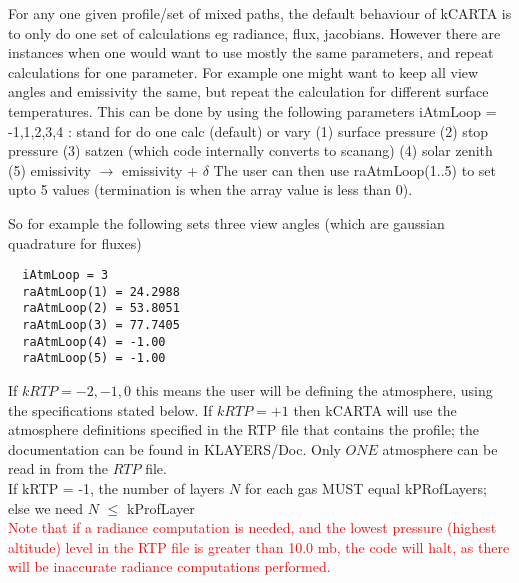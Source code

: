 \documentclass[12pt]{article}
\newcommand{\kc}{\textsf{kCARTA}\xspace}
\begin{document}
{\medskip
For any one given profile/set of mixed paths, the default behaviour of \kc is to only do one set
of calculations eg radiance, flux, jacobians. However there are instances when one would want
to use mostly the same parameters, and repeat calculations for one parameter. For example one
might want to keep all view angles and emissivity the same, but repeat the calculation for
different surface temperatures. This can be done by using the following parameters \newline
iAtmLoop = -1,1,2,3,4 : stand for do one calc (default) or vary \newline
  (1) surface pressure (2) stop pressure (3) satzen (which code internally converts to scanang) (4) solar zenith
  (5) emissivity $\rightarrow$ emissivity + $\delta$ \newline
The user can then use raAtmLoop(1..5) to set upto 5 values (termination is when the array
value is less than 0).

So for example the following sets three view angles (which are gaussian quadrature for fluxes)
\newline
\begin{verbatim}
  iAtmLoop = 3
  raAtmLoop(1) = 24.2988
  raAtmLoop(2) = 53.8051
  raAtmLoop(3) = 77.7405
  raAtmLoop(4) = -1.00
  raAtmLoop(5) = -1.00
\end{verbatim}

\medskip
If $kRTP = -2,-1,0$ this means the user will be defining the atmosphere, 
using the specifications stated below. If $kRTP = +1$ then \kc will use the 
atmosphere definitions specified in the RTP file that contains the profile; 
the documentation can be found in KLAYERS/Doc. Only $ONE$ atmosphere can
be read in from the $RTP$ file. \\
If kRTP = -1, the number of layers $N$ for each gas MUST equal kPRofLayers; 
else we need $N$ $\le$ kProfLayer\\
\textcolor{red}
{Note that if a radiance computation is needed,
and the lowest pressure (highest altitude) level in the RTP file is greater 
than 10.0 mb, the code will halt, as there will be inaccurate radiance
computations performed.}

\medskip
}
\end{document}

